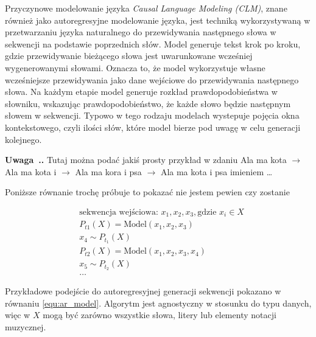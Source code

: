 \documentclass[data-science]{agh-wi} %
\newcounter{comment}[chapter]
\newenvironment{comment}[1][]{\begin{shaded}\refstepcounter{comment}
\noindent \textbf{Uwaga~\thechapter.\thecomment. #1} \rmfamily}{\end{shaded}}
\begin{document}
Przyczynowe modelowanie języka \textit{Causal Language Modeling (CLM)}, znane również jako autoregresyjne modelowanie języka, jest techniką wykorzystywaną w przetwarzaniu języka naturalnego do przewidywania następnego słowa w sekwencji na podstawie poprzednich słów. Model generuje tekst krok po kroku, gdzie przewidywanie bieżącego słowa jest uwarunkowane wcześniej wygenerowanymi słowami. Oznacza to, że model wykorzystuje własne wcześniejsze przewidywania jako dane wejściowe do przewidywania następnego słowa. Na każdym etapie model generuje rozkład prawdopodobieństwa w słowniku, wskazując prawdopodobieństwo, że każde słowo będzie następnym słowem w sekwencji. Typowo w tego rodzaju modelach wystepuje pojęcia okna kontekstowego, czyli ilości słów, które model bierze pod uwagę w celu generacji kolejnego.
\begin{comment}
Tutaj można podać jakiś prosty przykład w zdaniu Ala ma kota $\rightarrow$ Ala ma kota i $\rightarrow$ Ala ma kora i psa $\rightarrow$ Ala ma kota i psa imieniem \dots

Poniższe równanie trochę próbuje to pokazać nie jestem pewien czy zostanie
\end{comment}

\begin{align*}
     & \text{sekwencja wejściowa: } x_1, x_2, x_3, \text{gdzie } x_i \in X \\
     & P_{t1}(X) = \text{Model}(x_1, x_2, x_3)                             \\
     & x_4 \sim P_{t_1}(X)                                                 \\
     & P_{t2}(X) = \text{Model}(x_1, x_2, x_3, x_4)                        \\
     & x_5 \sim P_{t_2}(X)                                                 \\
     & \dots
    \label{equ:ar_model}
\end{align*}

Przykładowe podejście do autoregresyjnej generacji sekwencji pokazano w równaniu \ref*{equ:ar_model}. Algorytm jest agnostyczny w stosunku do typu danych, więc w $X$ mogą być zarówno wszystkie słowa, litery lub elementy notacji muzycznej.
\end{document}
